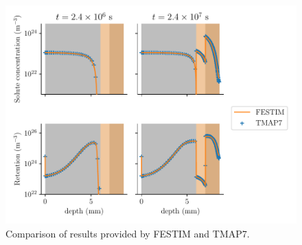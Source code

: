 \begin{figure} [h]
    \centering
    \includegraphics[width=\linewidth]{Figures/Chapter3/monoblocks/interface_condition/iter case/comparison_codes.pdf}
    \caption{Comparison of results provided by FESTIM and TMAP7.}
\end{figure}

